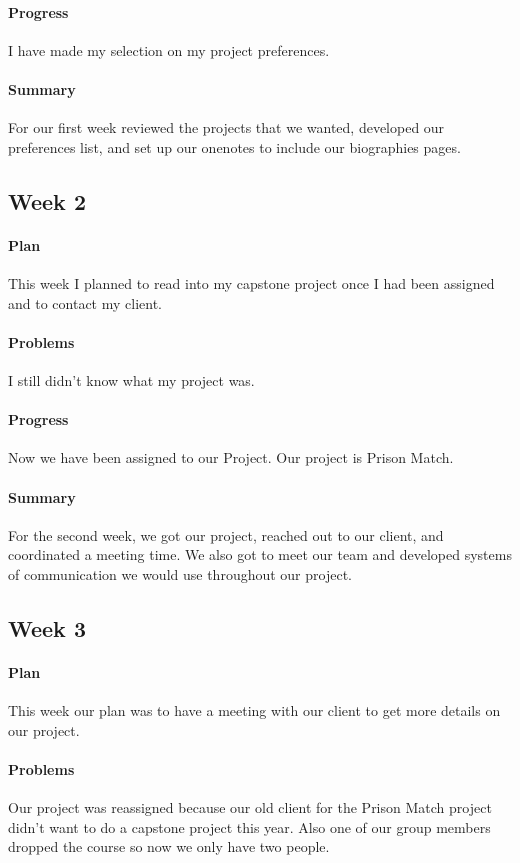 \documentclass[onecolumn, draftclsnofoot,10pt, compsoc]{IEEEtran}
\begin{document}
\paragraph{Progress}
I have made my selection on my project preferences.
\paragraph{Summary}
For our first week reviewed the projects that we wanted, developed our preferences list, and set up our onenotes to include our biographies pages.

\subsection{Week 2}
\paragraph{Plan}
This week I planned to read into my capstone project once I had been assigned and to contact my client.
\paragraph{Problems}
 I still didn't know what my project was.
\paragraph{Progress}
Now we have been assigned to our Project. Our project is Prison Match.
\paragraph{Summary}
For the second week, we got our project, reached out to our client, and coordinated a meeting time. We also got to meet our team and developed systems of communication we would use throughout our project.

\subsection{Week 3}
\paragraph{Plan}
 This week our plan was to have a meeting with our client to get more details on our project.
\paragraph{Problems}
Our project was reassigned because our old client for the Prison Match project didn't want to do a capstone project this year. Also one of our group members dropped the course so now we only have two people.
\end{document}
